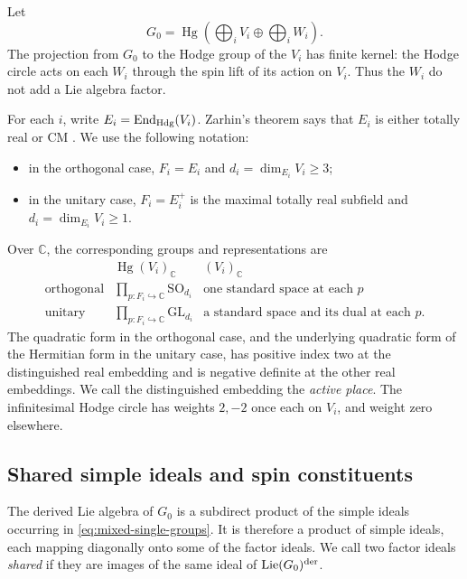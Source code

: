 \documentclass[11pt]{article}
\numberwithin{equation}{section}
\theoremstyle{definition}
\theoremstyle{remark}
\begin{document}
Let
\[
 G_0=\operatorname{Hg}\left(\bigoplus_i V_i\oplus\bigoplus_i W_i\right).
\]
The projection from $G_0$ to the Hodge group of the $V_i$ has finite
kernel: the Hodge circle acts on each $W_i$ through the spin lift of
its action on $V_i$.  Thus the $W_i$ do not add a Lie algebra factor.

For each $i$, write $E_i=\operatorname{End}_{\rm Hdg}(V_i)$.  Zarhin's theorem says
that $E_i$ is either totally real or CM \cite{Zarhin}.  We use the
following notation:
\begin{itemize}
\item in the orthogonal case, $F_i=E_i$ and
  $d_i=\dim_{E_i}V_i\ge3$;
\item in the unitary case, $F_i=E_i^+$ is the maximal totally real
  subfield and $d_i=\dim_{E_i}V_i\ge1$.
\end{itemize}
Over $\mathbb C$, the corresponding groups and representations are
\begin{equation}\label{eq:mixed-single-groups}
 \begin{array}{c|c|c}
 &\operatorname{Hg}(V_i)_{\mathbb C}&(V_i)_{\mathbb C}\\ \hline
 \text{orthogonal}&\displaystyle\prod_{p:F_i\hookrightarrow\mathbb C}
       \mathrm{SO}_{d_i}
   &\text{one standard space at each }p\\[3pt]
 \text{unitary}&\displaystyle\prod_{p:F_i\hookrightarrow\mathbb C}
       \mathrm{GL}_{d_i}
   &\text{a standard space and its dual at each }p .
 \end{array}
\end{equation}
The quadratic form in the orthogonal case, and the underlying quadratic
form of the Hermitian form in the unitary case, has positive index two
at the distinguished real embedding and is negative definite at the
other real embeddings.  We call the distinguished embedding the
\emph{active place}.  The infinitesimal Hodge circle has weights
$2,-2$ once each on $V_i$, and weight zero elsewhere.

\subsection{Shared simple ideals and spin constituents}

The derived Lie algebra of $G_0$ is a subdirect product of the simple
ideals occurring in \eqref{eq:mixed-single-groups}.  It is therefore
a product of simple ideals, each mapping diagonally onto some of the
factor ideals.  We call two factor ideals \emph{shared} if they are
images of the same ideal of $\operatorname{Lie}(G_0)^{\rm der}$.
\end{document}
